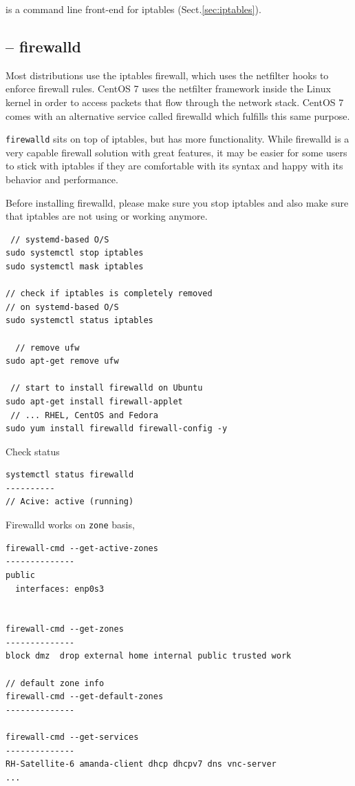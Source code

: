 is a command line front-end  for iptables
(Sect.\ref{sec:iptables}).


\subsection{-- firewalld}
\label{sec:firewalld}

Most distributions use the iptables firewall, which uses the netfilter hooks to
enforce firewall rules. CentOS 7 uses the netfilter framework inside the Linux
kernel in order to access packets that flow through the network stack.  CentOS 7
comes with an alternative service called firewalld which fulfills this same
purpose.

\verb!firewalld! sits on top of iptables, but has more functionality.
While firewalld is a very capable firewall solution with great features, it may
be easier for some users to stick with iptables if they are comfortable with its
syntax and happy with its behavior and performance.   

Before installing firewalld, please make sure you stop iptables and also make
sure that iptables are not using or working anymore.
\begin{verbatim}
 // systemd-based O/S
sudo systemctl stop iptables
sudo systemctl mask iptables

// check if iptables is completely removed
// on systemd-based O/S
sudo systemctl status iptables

  // remove ufw
sudo apt-get remove ufw

 // start to install firewalld on Ubuntu
sudo apt-get install firewall-applet 
 // ... RHEL, CentOS and Fedora
sudo yum install firewalld firewall-config -y
\end{verbatim}


Check status
\begin{verbatim}
systemctl status firewalld
----------
// Acive: active (running)
\end{verbatim}

Firewalld works on \verb!zone! basis, 
\begin{verbatim}
firewall-cmd --get-active-zones
--------------
public
  interfaces: enp0s3


firewall-cmd --get-zones
--------------
block dmz  drop external home internal public trusted work

// default zone info
firewall-cmd --get-default-zones
--------------

firewall-cmd --get-services
--------------
RH-Satellite-6 amanda-client dhcp dhcpv7 dns vnc-server 
...
\end{verbatim}


